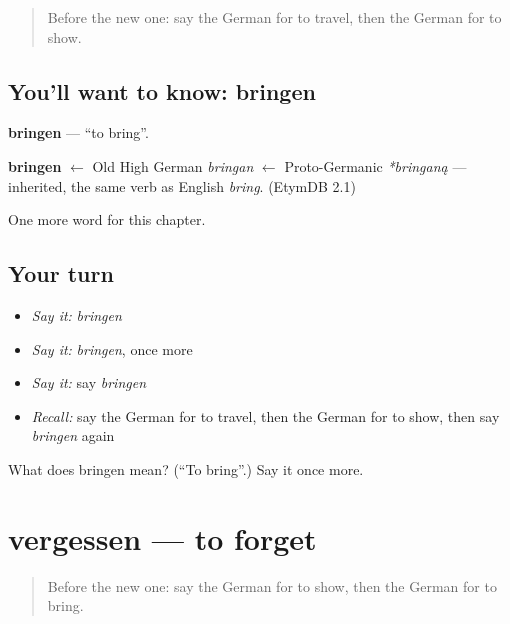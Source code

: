 \label{lesson:GE-C66-bringen}



\begin{quote}
Before the new one: say the German for to travel, then the German for to show.
\end{quote}

\subsection*{You'll want to know: bringen}
\textbf{bringen} — \textquotedblleft{}to bring\textquotedblright{}.

\begin{cousinweb}
\textbf{bringen} $\leftarrow$ Old High German \emph{bringan} $\leftarrow$ Proto-Germanic \emph{*bringaną} — inherited, the same verb as English \emph{bring}. (EtymDB 2.1)
\end{cousinweb}

\begin{grammarlens}[title={What you've built}]
One more word for this chapter.
\end{grammarlens}

\subsection*{Your turn}
\begin{itemize}
\raggedright
  \item \emph{Say it:} \emph{bringen}
  \item \emph{Say it:} \emph{bringen}, once more
  \item \emph{Say it:} say \emph{bringen}
  \item \emph{Recall:} say the German for to travel, then the German for to show, then say \emph{bringen} again
\end{itemize}

\begin{tcolorbox}[breakable,colback=teal!4,colframe=teal!35!black,title={Before you move on}]
What does bringen mean? (\textquotedblleft{}To bring\textquotedblright{}.) Say it once more.
\end{tcolorbox}
\section[vergessen]{vergessen — to forget}

\label{lesson:GE-C66-vergessen}



\begin{quote}
Before the new one: say the German for to show, then the German for to bring.
\end{quote}

